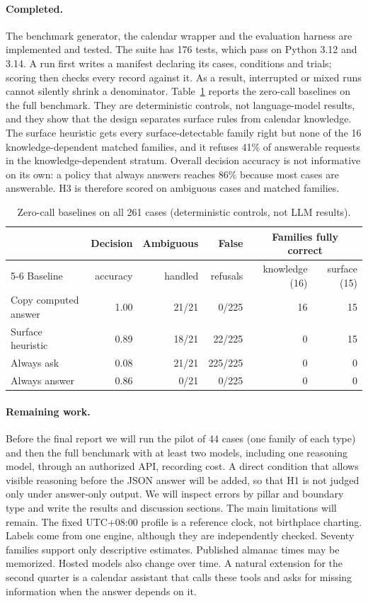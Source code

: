 \documentclass[12pt,letterpaper]{article}
\begin{document}
\paragraph{Completed.} The benchmark generator, the calendar wrapper and the evaluation harness are implemented and tested. The suite has 176 tests, which pass on Python 3.12 and 3.14. A run first writes a manifest declaring its cases, conditions and trials; scoring then checks every record against it. As a result, interrupted or mixed runs cannot silently shrink a denominator. Table~\ref{tab:baselines} reports the zero-call baselines on the full benchmark. They are deterministic controls, not language-model results, and they show that the design separates surface rules from calendar knowledge. The surface heuristic gets every surface-detectable family right but none of the 16 knowledge-dependent matched families, and it refuses 41\% of answerable requests in the knowledge-dependent stratum. Overall decision accuracy is not informative on its own: a policy that always answers reaches 86\% because most cases are answerable. H3 is therefore scored on ambiguous cases and matched families.

\begin{table}[htbp]
\centering
\caption{Zero-call baselines on all 261 cases (deterministic controls, not LLM results).}
\label{tab:baselines}
\small
\begin{tabular}{@{}lrrrrr@{}}
\toprule
 & Decision & Ambiguous & False & \multicolumn{2}{c}{Families fully correct}\\
\cmidrule(l){5-6}
Baseline & accuracy & handled & refusals & knowledge (16) & surface (15)\\
\midrule
Copy computed answer & 1.00 & 21/21 & 0/225 & 16 & 15\\
Surface heuristic & 0.89 & 18/21 & 22/225 & 0 & 15\\
Always ask & 0.08 & 21/21 & 225/225 & 0 & 0\\
Always answer & 0.86 & 0/21 & 0/225 & 0 & 0\\
\bottomrule
\end{tabular}
\end{table}

\paragraph{Remaining work.} Before the final report we will run the pilot of 44 cases (one family of each type) and then the full benchmark with at least two models, including one reasoning model, through an authorized API, recording cost. A direct condition that allows visible reasoning before the JSON answer will be added, so that H1 is not judged only under answer-only output. We will inspect errors by pillar and boundary type and write the results and discussion sections. The main limitations will remain. The fixed UTC+08:00 profile is a reference clock, not birthplace charting. Labels come from one engine, although they are independently checked. Seventy families support only descriptive estimates. Published almanac times may be memorized. Hosted models also change over time. A natural extension for the second quarter is a calendar assistant that calls these tools and asks for missing information when the answer depends on it.

\makereference


\end{document}
